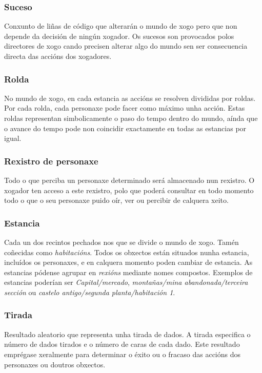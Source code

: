 \subsubsection{Suceso}
Conxunto de liñas de código que alterarán o mundo de xogo pero que non depende da decisión de ningún xogador. Os sucesos son provocados polos directores de xogo cando precisen alterar algo do mundo sen ser consecuencia directa das accións dos xogadores.

\subsubsection{Rolda}
No mundo de xogo, en cada estancia as accións se resolven divididas por roldas. Por cada rolda, cada personaxe pode facer como máximo unha acción. Estas roldas representan simbolicamente o paso do tempo dentro do mundo, aínda que o avance do tempo pode non coincidir exactamente en todas as estancias por igual.

\subsubsection{Rexistro de personaxe}
Todo o que perciba un personaxe determinado será almacenado nun rexistro. O xogador ten acceso a este rexistro, polo que poderá consultar en todo momento todo o que o seu personaxe puido oír, ver ou percibir de calquera xeito.

\subsubsection{Estancia}
Cada un dos recintos pechados nos que se divide o mundo de xogo. Tamén coñecidas como {\it habitacións}. Todos os obxectos están situados nunha estancia, incluídos os personaxes, e en calquera momento poden cambiar de estancia. As estancias pódense agrupar en {\it rexións} mediante nomes compostos.
Exemplos de estancias poderían ser {\it Capital/mercado}, {\it montañas/mina abandonada/terceira sección} ou {\it castelo antigo/segunda planta/habitación 1}.

\subsubsection{Tirada}
Resultado aleatorio que representa unha tirada de dados. A tirada especifica o número de dados tirados e o número de caras de cada dado. Este resultado emprégase xeralmente para determinar o éxito ou o fracaso das accións dos personaxes ou doutros obxectos.

